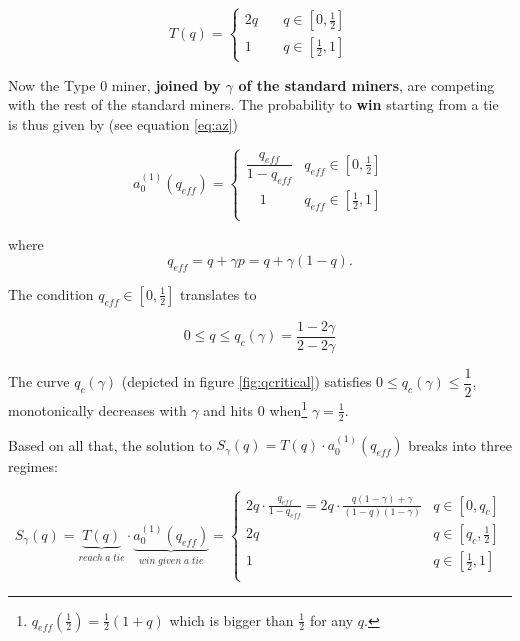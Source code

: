\documentclass[letterpaper,12pt]{report}
\theoremstyle{plain}
\theoremstyle{definition}
\begin{document}
\begin{equation}\label{eq:qofp}
\mathit{T}(q)=
\begin{cases}
2q & \quad q \in [0,\frac{1}{2}] \\
1 & \quad q \in [\frac{1}{2},1] 
\end{cases}
\end{equation}

Now the Type 0 miner, \textbf{joined by $\gamma$ of the standard miners}, are competing with the rest of the standard miners. The probability to \textbf{win} starting from a tie is thus given by (see equation \ref{eq:az}) 

\begin{equation}\label{eq:azeroeff}
\mathit{a}^{(1)}_0(q_{eff})=\begin{cases} \dfrac{q_{eff}}{1-q_{eff}} & q_{eff}\in [0,\frac{1}{2}] \\  
\quad 1 & q_{eff}\in [\frac{1}{2},1] \\ \end{cases}
\end{equation}

where 
\begin{equation}\label{qeff}
q_{eff}=q+\gamma p=q+\gamma(1-q).
\end{equation}

The condition $q_{eff}\in [0,\frac{1}{2}]$ translates to 

\begin{equation}\label{qcrit}
0\leq q\leq q_{c}(\gamma)=\dfrac{1-2\gamma}{2-2\gamma}
\end{equation}

The curve $q_c(\gamma)$ (depicted in figure \ref{fig:qcritical}) satisfies $0 \leq   q_{c}(\gamma) \leq\dfrac{1}{2}$, monotonically decreases with $\gamma$ and hits $0$ when\footnote{$q_{eff}(\frac{1}{2})=\frac{1}{2}(1+q)$ which is bigger than $\frac{1}{2}$ for any $q$.} $\gamma=\frac{1}{2}$.

Based on all that, the solution to $S_\gamma(q)=T(q)\cdot a_0^{(1)}(q_{eff})$ breaks into three regimes:

\begin{equation}\label{eq:sofq}
S_\gamma(q)=\underbrace{T(q)}_{reach\; a\; tie}\cdot \underbrace{a_0^{(1)}(q_{eff})}_{win\;given\;a\;tie}=
\begin{cases}
2q\cdot\frac{q_{eff}}{1-q_{eff}}=2q\cdot\frac{q(1-\gamma)+\gamma}{(1-q)(1-\gamma)} & q\in [0,q_c] \\ 
2q & q\in [q_c,\frac{1}{2}] \\ 
1 & q\in [\frac{1}{2},1] \\ 
\end{cases}
\end{equation}
\end{document}
